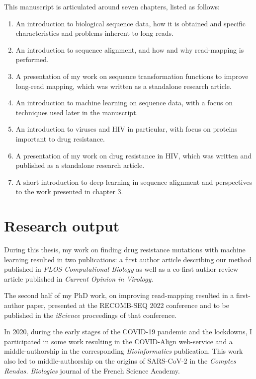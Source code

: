 \documentclass[
  11pt,
  twoside,
  BCOR=10mm,
  listof=totoc]{scrbook}
\providecommand{\tightlist}{%
  \setlength{\itemsep}{0pt}\setlength{\parskip}{0pt}}
\begin{document}
This manuscript is articulated around seven chapters, listed as follows:

\begin{enumerate}
\def\labelenumi{\arabic{enumi}.}
\tightlist
\item
  An introduction to biological sequence data, how it is obtained and specific characteristics and problems inherent to long reads.
\item
  An introduction to sequence alignment, and how and why read-mapping is performed.
\item
  A presentation of my work on sequence transformation functions to improve long-read mapping, which was written as a standalone research article.
\item
  An introduction to machine learning on sequence data, with a focus on techniques used later in the manuscript.
\item
  An introduction to viruses and HIV in particular, with focus on proteins important to drug resistance.
\item
  A presentation of my work on drug resistance in HIV, which was written and published as a standalone research article.
\item
  A short introduction to deep learning in sequence alignment and perspectives to the work presented in chapter 3.
\end{enumerate}

\hypertarget{research-output}{%
\section*{Research output}\label{research-output}}

During this thesis, my work on finding drug resistance mutations with machine learning resulted in two publications: a first author article describing our method published in \emph{PLOS Computational Biology} as well as a co-first author review article published in \emph{Current Opinion in Virology}.

The second half of my PhD work, on improving read-mapping resulted in a first-author paper, presented at the RECOMB-SEQ 2022 conference and to be published in the \emph{iScience} proceedings of that conference.

In 2020, during the early stages of the COVID-19 pandemic and the lockdowns, I participated in some work resulting in the COVID-Align web-service and a middle-authorship in the corresponding \emph{Bioinformatics} publication. This work also led to middle-authorship on the origins of SARS-CoV-2 in the \emph{Comptes Rendus. Biologies} journal of the French Science Academy.
\end{document}
